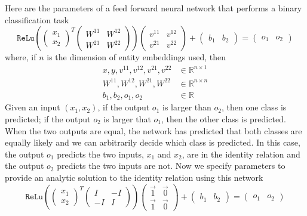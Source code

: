 Here are the parameters of a feed forward neural network that performs a binary classification task
%
\[ \texttt{ReLu}(\begin{pmatrix} x_1 \\ x_2  \end{pmatrix}^T \begin{pmatrix} W^{11} & W^{12}\\ W^{21}& W^{22} \end{pmatrix}) \begin{pmatrix} v^{11} & v^{12} \\ v^{21} & v^{22} \end{pmatrix} + \begin{pmatrix}b_1 &b_2 \end{pmatrix}= \begin{pmatrix} o_1 & o_2\end{pmatrix}\]
%
where, if $n$ is the dimension of entity embeddings used, then
%
\begin{align*}
  x, y,v^{11}, v^{12}, v^{21}, v^{22} &\in \mathbb{R}^{n \times 1} \\
  W^{11}, W^{12},W^{21}, W^{22} &\in \mathbb{R}^{n \times n} \\
  b_1, b_2, o_1, o_2 &\in \mathbb{R}
\end{align*}
%
Given an input $(x_1,x_2)$, if the output $o_1$ is larger than $o_2$, then one class is predicted; if the output $o_2$ is larger that $o_1$, then the other class is predicted. When the two outputs are equal, the network has predicted that both classes are equally likely and we can arbitrarily decide which class is predicted. In this case, the output $o_1$ predicts the two inputs, $x_1$ and $x_2$, are in the identity relation and the output $o_2$ predicts the two inputs are not. Now we specify parameters to provide an analytic solution to the identity relation using this network
%
\[ \texttt{ReLu}(\begin{pmatrix} x_1 \\ x_2 \end{pmatrix}^T \begin{pmatrix} I & -I\\ -I& I \end{pmatrix}) \begin{pmatrix} \vec{1} & \vec{0} \\ \vec{1} & \vec{0} \end{pmatrix} + \begin{pmatrix}b_1 &b_2 \end{pmatrix}= \begin{pmatrix} o_1 & o_2\end{pmatrix}\]
